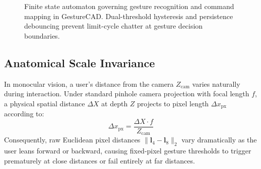 \begin{figure}[t]
    \centering
    \caption{Finite state automaton governing gesture recognition and command mapping in GestureCAD. Dual-threshold hysteresis and persistence debouncing prevent limit-cycle chatter at gesture decision boundaries.}
    \label{fig:gesture_workflow}
\end{figure}

\subsection{Anatomical Scale Invariance}
In monocular vision, a user's distance from the camera $Z_{\text{cam}}$ varies naturally during interaction. Under standard pinhole camera projection with focal length $f$, a physical spatial distance $\Delta X$ at depth $Z$ projects to pixel length $\Delta x_{\text{px}}$ according to:
\begin{equation}
\Delta x_{\text{px}} = \frac{\Delta X \cdot f}{Z_{\text{cam}}}
\label{eq:pinhole}
\end{equation}
Consequently, raw Euclidean pixel distances $\|\mathbf{l}_4 - \mathbf{l}_8\|_2$ vary dramatically as the user leans forward or backward, causing fixed-pixel gesture thresholds to trigger prematurely at close distances or fail entirely at far distances.

